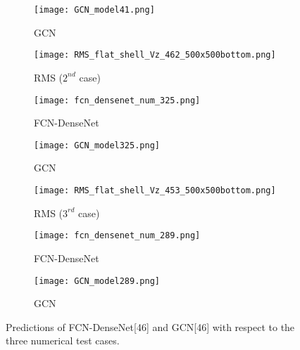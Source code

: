 \documentclass[11pt,a2paper]{report}
\begin{document}
\begin{enumerate}
\begin{figure}[ht!]
		\hfill
		\begin{subfigure}[b]{0.32\textwidth}
			\centering
			\texttt{[image: GCN\_model41.png]}
			\caption{GCN}
			\label{fig:AE_binary_RMS_391}
		\end{subfigure}
		\par\medskip
		\begin{subfigure}[b]{0.32\textwidth}
			\centering
			\texttt{[image: RMS\_flat\_shell\_Vz\_462\_500x500bottom.png]}
			\caption{RMS (\(2^{nd}\) case)}
			\label{fig:num_GT_462}
		\end{subfigure}
		\hfill
		\begin{subfigure}[b]{0.32\textwidth}
			\centering
			\texttt{[image: fcn\_densenet\_num\_325.png]}
			\caption{FCN-DenseNet}
			\label{fig:Convlstm_binary_RMS_462}
		\end{subfigure}
		\hfill
		\begin{subfigure}[b]{0.32\textwidth}
			\centering
			\texttt{[image: GCN\_model325.png]}
			\caption{GCN}
			\label{fig:AE_binary_RMS_462}
		\end{subfigure}
		\par\medskip
		\begin{subfigure}[b]{0.32\textwidth}
			\centering
			\texttt{[image: RMS\_flat\_shell\_Vz\_453\_500x500bottom.png]}
			\caption{RMS (\(3^{rd}\) case)}
			\label{fig:num_GT_453}
		\end{subfigure}
		\hfill	
		\begin{subfigure}[b]{0.32\textwidth}
			\centering
			\texttt{[image: fcn\_densenet\_num\_289.png]}
			\caption{FCN-DenseNet}
			\label{fig:Convlstm_binary_RMS_453}
		\end{subfigure}
		\hfill
		\begin{subfigure}[b]{0.32\textwidth}
			\centering
			\texttt{[image: GCN\_model289.png]}
			\caption{GCN}
			\label{fig:AE_binary_RMS_453}
		\end{subfigure}
		\caption{Predictions of FCN-DenseNet[46] and GCN[46] with respect to the three numerical test cases.}
		\label{fig:RMS_num_cases}
	\end{figure}


\end{enumerate}	
\end{document}
